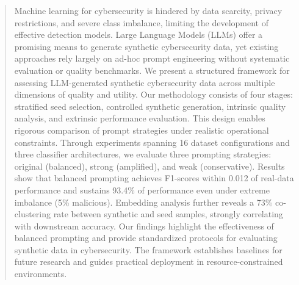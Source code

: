 \begin{abstract}
    
Machine learning for cybersecurity is hindered by data scarcity, privacy restrictions, and severe class imbalance, limiting the development of effective detection models. Large Language Models (LLMs) offer a promising means to generate synthetic cybersecurity data, yet existing approaches rely largely on ad-hoc prompt engineering without systematic evaluation or quality benchmarks. We present a structured framework for assessing LLM-generated synthetic cybersecurity data across multiple dimensions of quality and utility. Our methodology consists of four stages: stratified seed selection, controlled synthetic generation, intrinsic quality analysis, and extrinsic performance evaluation. This design enables rigorous comparison of prompt strategies under realistic operational constraints. Through experiments spanning 16 dataset configurations and three classifier architectures, we evaluate three prompting strategies: original (balanced), strong (amplified), and weak (conservative). Results show that balanced prompting achieves F1-scores within 0.012 of real-data performance and sustains 93.4\% of performance even under extreme imbalance (5\% malicious). Embedding analysis further reveals a 73\% co-clustering rate between synthetic and seed samples, strongly correlating with downstream accuracy. Our findings highlight the effectiveness of balanced prompting and provide standardized protocols for evaluating synthetic data in cybersecurity. The framework establishes baselines for future research and guides practical deployment in resource-constrained environments.
\end{abstract}
